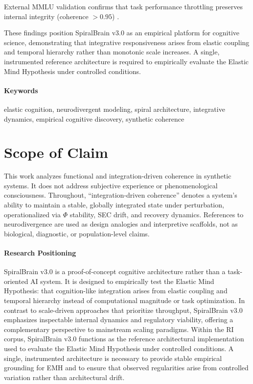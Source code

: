 \documentclass[11pt,a4paper]{article}
\renewenvironment{abstract}{
  \begin{center}
    {\large\bfseries \abstractname\vspace{-.5em}}
  \end{center}
}{}
\begin{document}
\begin{abstract}
\noindent External MMLU validation confirms that task performance throttling preserves internal integrity (coherence \( > 0.95 \)) \cite{mmlu_cognitive_integrity}.

These findings position SpiralBrain v3.0 as an empirical platform for cognitive science, demonstrating that integrative responsiveness arises from elastic coupling and temporal hierarchy rather than monotonic scale increases. A single, instrumented reference architecture is required to empirically evaluate the Elastic Mind Hypothesis under controlled conditions.
\end{abstract}

\paragraph{Keywords}
elastic cognition, neurodivergent modeling, spiral architecture, integrative dynamics, empirical cognitive discovery, synthetic coherence

\section*{Scope of Claim}

This work analyzes functional and integration-driven coherence in synthetic systems. It does not address subjective experience or phenomenological consciousness. Throughout, ``integration-driven coherence'' denotes a system's ability to maintain a stable, globally integrated state under perturbation, operationalized via \( \Phi \) stability, SEC drift, and recovery dynamics. References to neurodivergence are used as design analogies and interpretive scaffolds, not as biological, diagnostic, or population-level claims.

\paragraph{Research Positioning}
SpiralBrain v3.0 is a proof-of-concept cognitive architecture rather than a task-oriented AI system. It is designed to empirically test the Elastic Mind Hypothesis: that cognition-like integration arises from elastic coupling and temporal hierarchy instead of computational magnitude or task optimization. In contrast to scale-driven approaches that prioritize throughput, SpiralBrain v3.0 emphasizes inspectable internal dynamics and regulatory viability, offering a complementary perspective to mainstream scaling paradigms. Within the RI corpus, SpiralBrain v3.0 functions as the reference architectural implementation used to evaluate the Elastic Mind Hypothesis under controlled conditions. A single, instrumented architecture is necessary to provide stable empirical grounding for EMH and to ensure that observed regularities arise from controlled variation rather than architectural drift.
\end{document}
